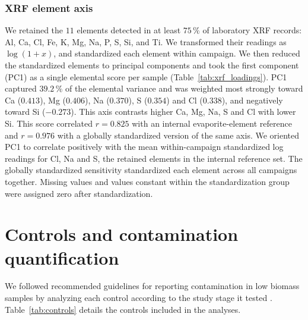 \documentclass[11pt]{article}
\begin{document}
\subsubsection{XRF element axis}
We retained the $11$ elements detected in at least $75\,\%$ of laboratory XRF records: Al, Ca, Cl, Fe, K, Mg, Na, P, S, Si, and Ti. We transformed their readings as $\log(1+x)$, and standardized each element within campaign. We then reduced the standardized elements to principal components and took the first component (PC1) as a single elemental score per sample (Table~\ref{tab:xrf_loadings}). PC1 captured $39.2\,\%$ of the elemental variance and was weighted most strongly toward Ca ($0.413$), Mg ($0.406$), Na ($0.370$), S ($0.354$) and Cl ($0.338$), and negatively toward Si ($-0.273$). This axis contrasts higher Ca, Mg, Na, S and Cl with lower Si. This score correlated $r = 0.825$ with an internal evaporite-element reference and $r = 0.976$ with a globally standardized version of the same axis.
We oriented PC1 to correlate positively with the mean within-campaign standardized log readings for Cl, Na and S, the retained elements in the internal reference set. The globally standardized sensitivity standardized each element across all campaigns together. Missing values and values constant within the standardization group were assigned zero after standardization.


\section{Controls and contamination quantification}\label{sup:controls}
We followed recommended guidelines for reporting contamination in low biomass samples by analyzing each control according to the study stage it tested \cite{fierer2025controls}. Table~\ref{tab:controls} details the controls included in the analyses.
\end{document}
